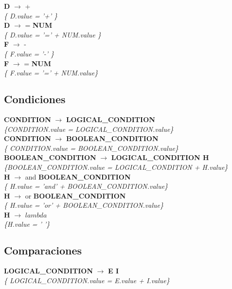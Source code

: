 \documentclass[10pt,a4paper]{article}
\begin{document}
\textbf{D} $\rightarrow$ +   \\
\textit{\{ D.value = '+'  \}} \\

\textbf{D} $\rightarrow$ = \textbf{NUM} \\
\textit{\{ D.value =  '=' + NUM.value  \}} \\

\textbf{F} $\rightarrow$ - \\
\textit{\{ F.value = '-'  \}} \\

\textbf{F} $\rightarrow$ = \textbf{NUM} \\
\textit{\{ F.value =  '=' + NUM.value\}} \\

\subsection{Condiciones}
\textbf{CONDITION} $\rightarrow$ \textbf{LOGICAL\_CONDITION}   \\
\textit{\{CONDITION.value = LOGICAL\_CONDITION.value\}}\\

\textbf{CONDITION} $\rightarrow$ \textbf{BOOLEAN\_CONDITION} \\
\textit{\{ CONDITION.value = BOOLEAN\_CONDITION.value\}} \\

\textbf{BOOLEAN\_CONDITION} $\rightarrow$ \textbf{LOGICAL\_CONDITION H} \\
\textit{\{BOOLEAN\_CONDITION.value = LOGICAL\_CONDITION + H.value\}} \\

\textbf{H} $\rightarrow$ and \textbf{BOOLEAN\_CONDITION} \\
\textit{\{ H.value = 'and' + BOOLEAN\_CONDITION.value\}} \\

\textbf{H} $\rightarrow$ or \textbf{BOOLEAN\_CONDITION} \\
\textit{\{ H.value = 'or' + BOOLEAN\_CONDITION.value\}} \\

\textbf{H} $\rightarrow$ $lambda$ \\
\textit{\{H.value = ' '\}} \\

\subsection{Comparaciones}
\textbf{LOGICAL\_CONDITION} $\rightarrow$ \textbf{E I} \\
\textit{\{ LOGICAL\_CONDITION.value = E.value + I.value\}} \\
\end{document}
